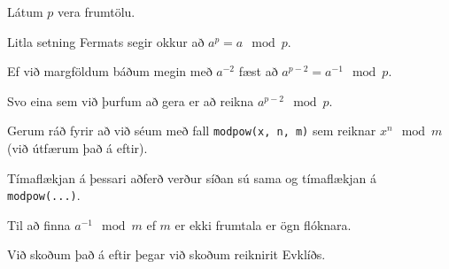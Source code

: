 {
	{
		\item<1-> Látum $p$ vera frumtölu.
		\item<2-> Litla setning Fermats segir okkur að $a^p = a \mod p$.
		\item<3-> Ef við margföldum báðum megin með $a^{-2}$ fæst að $a^{p - 2} = a^{-1} \mod p$.
		\item<4-> Svo eina sem við þurfum að gera er að reikna $a^{p - 2} \mod p$.
		\item<5-> Gerum ráð fyrir að við séum með fall \texttt{modpow(x, n, m)} sem reiknar $x^n \mod m$ (við útfærum það á eftir).
		\item<6->[] 
		\item<7-> Tímaflækjan á þessari aðferð verður síðan sú sama og tímaflækjan á \texttt{modpow(...)}.
	}
}

{
	{
		\item<1-> Til að finna $a^{-1} \mod m$ ef $m$ er ekki frumtala er ögn flóknara.
		\item<2-> Við skoðum það á eftir þegar við skoðum reiknirit Evklíðs.
	}
}

{
}


